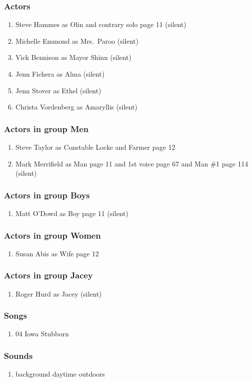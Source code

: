 \subsubsection{Actors}
\begin{enumerate}
\item Steve Hammes as Olin and contrary solo page 11 (silent)
\item Michelle Emmond as Mrs.~Paroo (silent)
\item Vick Bennison as Mayor Shinn (silent)
\item Jenn Fichera as Alma (silent)
\item Jenn Stover as Ethel (silent)
\item Christa Vordenberg as Amaryllis (silent)
\end{enumerate}
\subsubsection{Actors in group Men}
\begin{enumerate}
\item Steve Taylor as Constable Locke and Farmer page 12
\item Mark Merrifield as Man page 11 and 1st voice page 67 and Man \#1 page 114 (silent)
\end{enumerate}
\subsubsection{Actors in group Boys}
\begin{enumerate}
\item Matt O'Dowd as Boy page 11 (silent)
\end{enumerate}
\subsubsection{Actors in group Women}
\begin{enumerate}
\item Susan Abis as Wife page 12
\end{enumerate}
\subsubsection{Actors in group Jacey}
\begin{enumerate}
\item Roger Hurd as Jacey (silent)
\end{enumerate}

\subsubsection{Songs}
\begin{enumerate}
\item 04 Iowa Stubborn
\end{enumerate}\subsubsection{Sounds}
\begin{enumerate}
\item background daytime outdoors
\end{enumerate}

